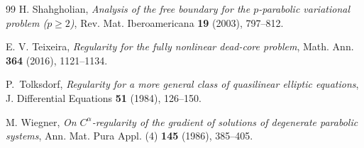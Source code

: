 \documentclass[11pt,oneside,english]{amsart}
\numberwithin{equation}{section}
\theoremstyle{plain}
\numberwithin{equation}{section}
\begin{document}
\begin{thebibliography}{99}
H. Shahgholian,
\emph{Analysis of the free boundary for the $p$-parabolic variational problem ($p \ge 2$)},
Rev. Mat. Iberoamericana \textbf{19} (2003), 797--812.

E. V. Teixeira,
\emph{Regularity for the fully nonlinear dead-core problem},
Math. Ann. \textbf{364} (2016), 1121--1134.

P.~Tolksdorf,
\emph{Regularity for a more general class of quasilinear elliptic equations},
J. Differential Equations \textbf{51} (1984), 126--150.

M. Wiegner,
\emph{On $C^{\alpha}$-regularity of the gradient of solutions of degenerate parabolic systems},
Ann. Mat. Pura Appl. (4) \textbf{145} (1986), 385--405.



\end{thebibliography}
\end{document}
